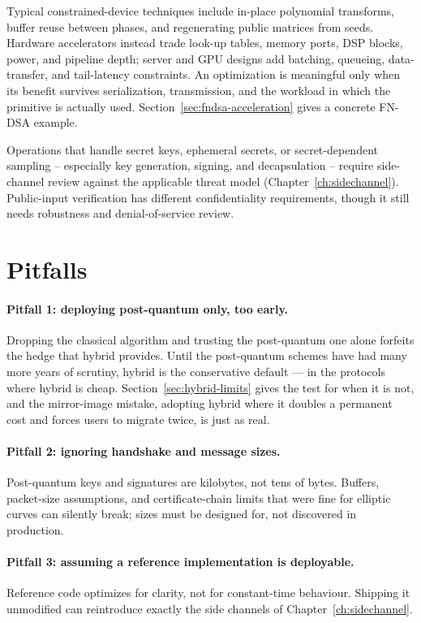 Typical constrained-device techniques include in-place polynomial transforms,
buffer reuse between phases, and regenerating public matrices from seeds. Hardware
accelerators instead trade look-up tables, memory ports, DSP blocks, power, and
pipeline depth; server and GPU designs add batching, queueing, data-transfer, and
tail-latency constraints. An optimization is meaningful only when its benefit
survives serialization, transmission, and the workload in which the primitive is
actually used. Section~\ref{sec:fndsa-acceleration} gives a concrete FN-DSA example.

Operations that handle secret keys,
ephemeral secrets, or secret-dependent sampling -- especially key generation, signing,
and decapsulation -- require side-channel review against the applicable threat model
(Chapter~\ref{ch:sidechannel}). Public-input verification has different confidentiality
requirements, though it still needs robustness and denial-of-service review.

\section{Pitfalls}

\paragraph{Pitfall 1: deploying post-quantum only, too early.}
Dropping the classical algorithm and trusting the post-quantum one alone forfeits the hedge that hybrid provides. Until the post-quantum schemes have had many more years of scrutiny, hybrid is the conservative default --- in the protocols where hybrid is cheap. Section~\ref{sec:hybrid-limits} gives the test for when it is not, and the mirror-image mistake, adopting hybrid where it doubles a permanent cost and forces users to migrate twice, is just as real.

\paragraph{Pitfall 2: ignoring handshake and message sizes.}
Post-quantum keys and signatures are kilobytes, not tens of bytes. Buffers, packet-size assumptions, and certificate-chain limits that were fine for elliptic curves can silently break; sizes must be designed for, not discovered in production.

\paragraph{Pitfall 3: assuming a reference implementation is deployable.}
Reference code optimizes for clarity, not for constant-time behaviour. Shipping it unmodified can reintroduce exactly the side channels of Chapter~\ref{ch:sidechannel}.

